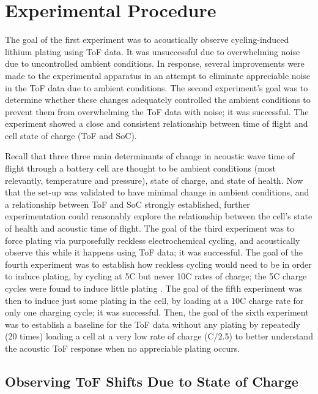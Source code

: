 \chapter{Experimental Procedure}
The goal of the first experiment was to acoustically observe cycling-induced lithium plating using ToF data. It was unsuccessful due to overwhelming noise due to uncontrolled ambient conditions. In response, several improvements were made to the experimental apparatus in an attempt to eliminate appreciable noise in the ToF data due to ambient conditions. The second experiment's goal was to determine whether these changes adequately controlled the ambient conditions to prevent them from overwhelming the ToF data with noise; it was successful. The experiment showed a close and consistent relationship between time of flight and cell state of charge (ToF and SoC).

Recall that three three main determinants of change in acoustic wave time of flight through a battery cell are thought to be ambient conditions (most relevantly, temperature and pressure), state of charge, and state of health. Now that the set-up was validated to have minimal change in ambient conditions, and a relationship between ToF and SoC strongly established, further experimentation could reasonably explore the relationship between the cell's state of health and acoustic time of flight. The goal of the third experiment was to force plating via purposefully reckless electrochemical cycling, and acoustically observe this while it happens using ToF data; it was successful. The goal of the fourth experiment was to establish how reckless cycling would need to be in order to induce plating, by cycling at 5C but never 10C rates of charge; the 5C charge cycles were found to induce little plating . The goal of the fifth experiment was then to induce just some plating in the cell, by loading at a 10C charge rate for only one charging cycle; it was successful. Then, the goal of the sixth experiment was to establish a baseline for the ToF data without any plating by repeatedly (20 times) loading a cell at a very low rate of charge (C/2.5) to better understand the acoustic ToF response when no appreciable plating occurs.

\section{Observing ToF Shifts Due to State of Charge}

